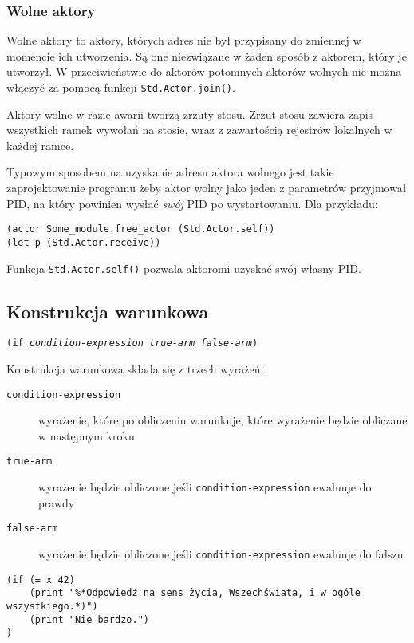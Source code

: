 \subsubsection{Wolne aktory}

Wolne aktory to aktory, których adres nie był przypisany do zmiennej w momencie ich utworzenia. Są one
niezwiązane w żaden sposób z aktorem, który je utworzył. W przeciwieństwie do aktorów potomnych aktorów
wolnych nie można włączyć za pomocą funkcji \texttt{Std.Actor.join()}.

Aktory wolne w razie awarii tworzą zrzuty stosu. Zrzut stosu zawiera zapis
wszystkich ramek wywołań na stosie, wraz z zawartością rejestrów lokalnych w
każdej ramce.

Typowym sposobem na uzyskanie adresu aktora wolnego jest takie zaprojektowanie programu żeby aktor wolny jako
jeden z parametrów przyjmował PID, na który powinien wysłać \emph{swój} PID po wystartowaniu. Dla przykładu:

\begin{lstlisting}
(actor Some_module.free_actor (Std.Actor.self))
(let p (Std.Actor.receive))
\end{lstlisting}

Funkcja \texttt{Std.Actor.self()} pozwala aktoromi uzyskać swój własny PID.

\subsection{Konstrukcja warunkowa}

\texttt{(if \emph{condition-expression} \emph{true-arm} \emph{false-arm})}
\newline

Konstrukcja warunkowa składa się z trzech wyrażeń:

\begin{description}
    \item[\texttt{condition-expression}] wyrażenie, które po obliczeniu warunkuje, które wyrażenie będzie
        obliczane w następnym kroku
    \item[\texttt{true-arm}] wyrażenie będzie obliczone jeśli \texttt{condition-expression} ewaluuje do prawdy
    \item[\texttt{false-arm}] wyrażenie będzie obliczone jeśli \texttt{condition-expression} ewaluuje do
        fałszu
\end{description}

\begin{lstlisting}
(if (= x 42)
    (print "%*Odpowiedź na sens życia, Wszechświata, i w ogóle wszystkiego.*)")
    (print "Nie bardzo.")
)
\end{lstlisting}

